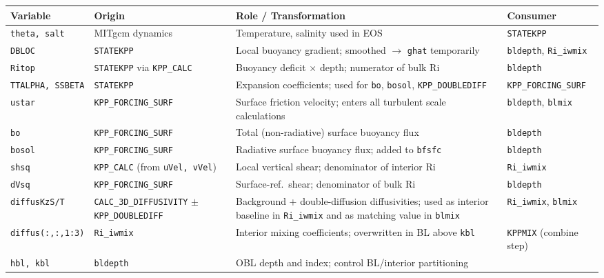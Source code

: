 \documentclass[12pt,letterpaper]{article}
\begin{document}
\begin{longtable}{p{2.8cm} p{2.8cm} p{5cm} l}  
\toprule  
\textbf{Variable} & \textbf{Origin} & \textbf{Role / Transformation} &  
\textbf{Consumer} \\  
\midrule  
\endhead  
\texttt{theta, salt} &  
  MITgcm dynamics &  
  Temperature, salinity used in EOS &  
  \texttt{STATEKPP} \\[4pt]  
\texttt{DBLOC} &  
  \texttt{STATEKPP} &  
  Local buoyancy gradient; smoothed $\to$ \texttt{ghat} temporarily &  
  \texttt{bldepth}, \texttt{Ri\_iwmix} \\[4pt]  
\texttt{Ritop} &  
  \texttt{STATEKPP} via \texttt{KPP\_CALC} &  
  Buoyancy deficit $\times$ depth; numerator of bulk Ri &  
  \texttt{bldepth} \\[4pt]  
\texttt{TTALPHA, SSBETA} &  
  \texttt{STATEKPP} &  
  Expansion coefficients; used for \texttt{bo}, \texttt{bosol},  
  \texttt{KPP\_DOUBLEDIFF} &  
  \texttt{KPP\_FORCING\_SURF} \\[4pt]  
\texttt{ustar} &  
  \texttt{KPP\_FORCING\_SURF} &  
  Surface friction velocity; enters all turbulent scale calculations &  
  \texttt{bldepth}, \texttt{blmix} \\[4pt]  
\texttt{bo} &  
  \texttt{KPP\_FORCING\_SURF} &  
  Total (non-radiative) surface buoyancy flux &  
  \texttt{bldepth} \\[4pt]  
\texttt{bosol} &  
  \texttt{KPP\_FORCING\_SURF} &  
  Radiative surface buoyancy flux; added to \texttt{bfsfc} &  
  \texttt{bldepth} \\[4pt]  
\texttt{shsq} &  
  \texttt{KPP\_CALC} (from \texttt{uVel, vVel}) &  
  Local vertical shear; denominator of interior Ri &  
  \texttt{Ri\_iwmix} \\[4pt]  
\texttt{dVsq} &  
  \texttt{KPP\_FORCING\_SURF} &  
  Surface-ref.\ shear; denominator of bulk Ri &  
  \texttt{bldepth} \\[4pt]  
\texttt{diffusKzS/T} &  
  \texttt{CALC\_3D\_DIFFUSIVITY} $\pm$ \texttt{KPP\_DOUBLEDIFF} &  
  Background + double-diffusion diffusivities;  
  used as interior baseline in \texttt{Ri\_iwmix} and as matching value  
  in \texttt{blmix} &  
  \texttt{Ri\_iwmix}, \texttt{blmix} \\[4pt]  
\texttt{diffus(:,:,1:3)} &  
  \texttt{Ri\_iwmix} &  
  Interior mixing coefficients; overwritten in BL above \texttt{kbl} &  
  \texttt{KPPMIX} (combine step) \\[4pt]  
\texttt{hbl, kbl} &  
  \texttt{bldepth} &  
  OBL depth and index; control BL/interior partitioning &  

\end{longtable}
\end{document}
